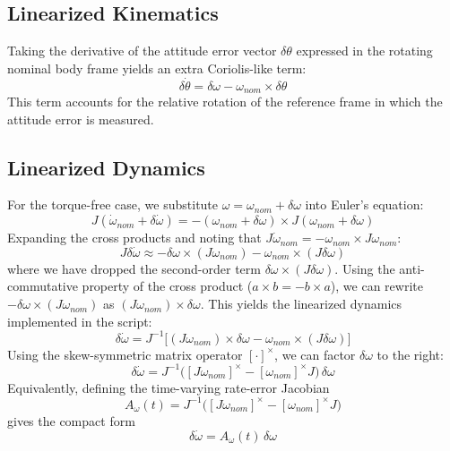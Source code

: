 \documentclass[11pt]{article}
\begin{document}
\subsection{Linearized Kinematics}
Taking the derivative of the attitude error vector $\delta\theta$ expressed in the rotating nominal body frame yields an extra Coriolis-like term:
\begin{equation}
    \delta\dot{\theta} = \delta\omega - \omega_{nom} \times \delta\theta
\end{equation}
This term accounts for the relative rotation of the reference frame in which the attitude error is measured.

\subsection{Linearized Dynamics}
For the torque-free case, we substitute $\omega = \omega_{nom} + \delta\omega$ into Euler's equation:
\begin{equation}
    J (\dot{\omega}_{nom} + \delta\dot{\omega}) = -(\omega_{nom} + \delta\omega) \times J(\omega_{nom} + \delta\omega)
\end{equation}
Expanding the cross products and noting that $J\dot{\omega}_{nom} = -\omega_{nom} \times J\omega_{nom}$:
\begin{equation}
    J\delta\dot{\omega} \approx - \delta\omega \times (J\omega_{nom}) - \omega_{nom} \times (J\delta\omega)
\end{equation}
where we have dropped the second-order term $\delta\omega \times (J\delta\omega)$.
Using the anti-commutative property of the cross product ($a \times b = -b \times a$), we can rewrite $-\delta\omega \times (J\omega_{nom})$ as $(J\omega_{nom}) \times \delta\omega$. This yields the linearized dynamics implemented in the script:
\begin{equation}
    \delta\dot{\omega} = J^{-1} \Big[ (J\omega_{nom}) \times \delta\omega - \omega_{nom} \times (J\delta\omega) \Big]
\end{equation}
Using the skew-symmetric matrix operator $[\cdot]^\times$, we can factor $\delta\omega$ to the right:
\begin{equation}
    \delta\dot{\omega} = J^{-1} \Big( [J\omega_{nom}]^\times - [\omega_{nom}]^\times J \Big) \, \delta\omega
\end{equation}
Equivalently, defining the time-varying rate-error Jacobian
\begin{equation}
    A_{\omega}(t) = J^{-1} \Big( [J\omega_{nom}]^\times - [\omega_{nom}]^\times J \Big)
\end{equation}
gives the compact form
\begin{equation}
    \delta\dot{\omega} = A_{\omega}(t) \, \delta\omega
\end{equation}
\end{document}
